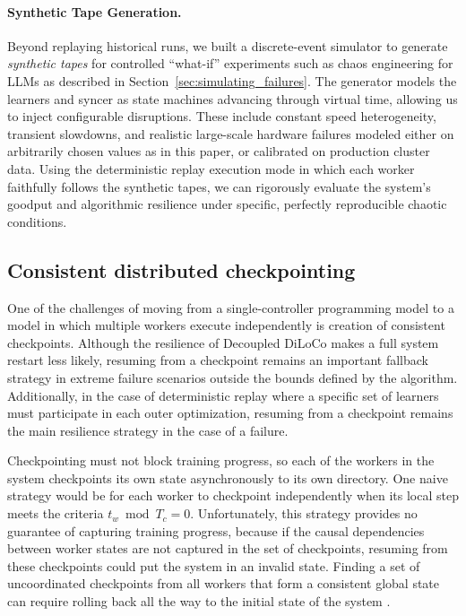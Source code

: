 \documentclass[11pt, a4paper, twocolumn, copyright, google]{google}
\begin{document}
\paragraph{Synthetic Tape Generation.}
Beyond replaying historical runs, we built a discrete-event simulator to generate \emph{synthetic tapes} for controlled ``what-if'' experiments such as chaos engineering for LLMs as described in Section~\ref{sec:simulating_failures}. The generator models the learners and syncer as state machines advancing through virtual time, allowing us to inject configurable disruptions. These include constant speed heterogeneity, transient slowdowns, and realistic large-scale hardware failures modeled either on arbitrarily chosen values as in this paper, or calibrated on production cluster data. Using the deterministic replay execution mode in which each worker faithfully follows the synthetic tapes, we can rigorously evaluate the system's goodput and algorithmic resilience under specific, perfectly reproducible chaotic conditions.


\subsection{Consistent distributed checkpointing}\label{sec:checkpointing}

One of the challenges of moving from a single-controller programming model to a model in which multiple workers execute independently is creation of consistent checkpoints. Although the resilience of Decoupled DiLoCo makes a full system restart less likely, resuming from a checkpoint remains an important fallback strategy in extreme failure scenarios outside the bounds defined by the algorithm. Additionally, in the case of deterministic replay where a specific set of learners must participate in each outer optimization, resuming from a checkpoint remains the main resilience strategy in the case of a failure.

Checkpointing must not block training progress, so each of the workers in the system checkpoints its own state asynchronously to its own directory. One naive strategy would be for each worker to checkpoint independently when its local step meets the criteria $t_w \bmod T_c = 0$. Unfortunately, this strategy provides no guarantee of capturing training progress, because if the causal dependencies between worker states are not captured in the set of checkpoints, resuming from these checkpoints could put the system in an invalid state. Finding a set of uncoordinated checkpoints from all workers that form a consistent global state \citep{mattern1989virtual} can require rolling back all the way to the initial state of the system \citep{elnozahy2002rollbackrecovery}.
\end{document}
